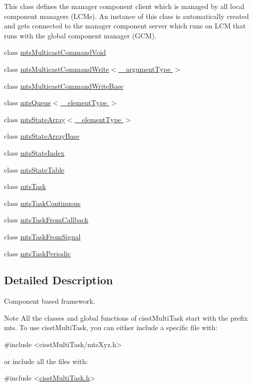 \begin{DoxyCompactItemize}
\begin{DoxyCompactList}
This class defines the manager component client which is managed by all local component managers (L\-C\-Ms). An instance of this class is automatically created and gets connected to the manager component server which runs on L\-C\-M that runs with the global component manager (G\-C\-M). \end{DoxyCompactList}\item 
class \hyperlink{classmts_multicast_command_void}{mts\-Multicast\-Command\-Void}
\item 
class \hyperlink{classmts_multicast_command_write}{mts\-Multicast\-Command\-Write$<$ \-\_\-argument\-Type $>$}
\item 
class \hyperlink{classmts_multicast_command_write_base}{mts\-Multicast\-Command\-Write\-Base}
\item 
class \hyperlink{classmts_queue}{mts\-Queue$<$ \-\_\-element\-Type $>$}
\item 
class \hyperlink{classmts_state_array}{mts\-State\-Array$<$ \-\_\-element\-Type $>$}
\item 
class \hyperlink{classmts_state_array_base}{mts\-State\-Array\-Base}
\item 
class \hyperlink{classmts_state_index}{mts\-State\-Index}
\item 
class \hyperlink{classmts_state_table}{mts\-State\-Table}
\item 
class \hyperlink{classmts_task}{mts\-Task}
\item 
class \hyperlink{classmts_task_continuous}{mts\-Task\-Continuous}
\item 
class \hyperlink{classmts_task_from_callback}{mts\-Task\-From\-Callback}
\item 
class \hyperlink{classmts_task_from_signal}{mts\-Task\-From\-Signal}
\item 
class \hyperlink{classmts_task_periodic}{mts\-Task\-Periodic}
\end{DoxyCompactItemize}


\subsection{Detailed Description}
Component based framework.

\begin{DoxyNote}{Note}
All the classes and global functions of cisst\-Multi\-Task start with the prefix mts. To use cisst\-Multi\-Task, you can either include a specific file with\-: 
\begin{DoxyCode}
\textcolor{preprocessor}{#include <cisstMultiTask/mtsXyz.h>}
\end{DoxyCode}
 or include all the files with\-: 
\begin{DoxyCode}
\textcolor{preprocessor}{#include <\hyperlink{cisst_multi_task_8h}{cisstMultiTask.h}>}
\end{DoxyCode}
 
\end{DoxyNote}
